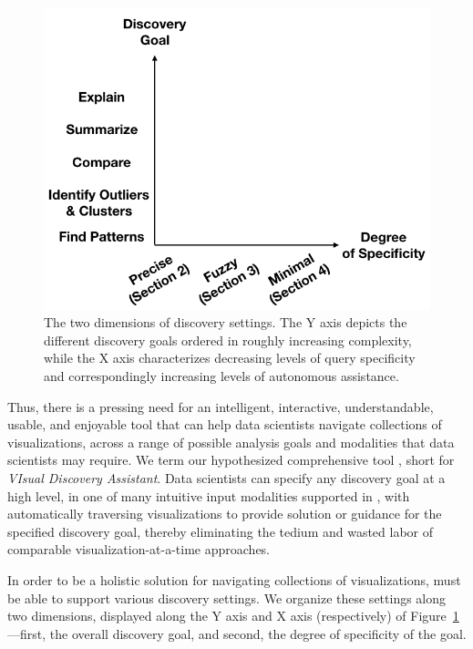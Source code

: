 \begin{figure}
\centering
\vspace{-10pt}
\includegraphics[width=\linewidth]{figures/dimensions_cropped.png}
\vspace{-15pt}
\caption{The two dimensions of discovery settings. The Y axis depicts the different discovery goals ordered in roughly increasing complexity, while the X axis characterizes decreasing levels of query specificity and correspondingly increasing levels of autonomous assistance.}\label{fig:dimensions}
\vspace{-15pt}
\end{figure}


\par
Thus, there is a pressing need for an 
intelligent,
interactive, understandable, usable, and
enjoyable tool that can help 
data scientists navigate
collections of visualizations, across a range of possible analysis goals and modalities that data scientists may require.
We term our hypothesized comprehensive tool \vida,
short for {\em VIsual Discovery Assistant}.
Data scientists can specify any discovery
goal at a high level, in one of many intuitive input modalities supported in \vida, with \vida automatically traversing visualizations to provide solution or guidance for the
specified discovery goal, thereby
eliminating the tedium and wasted
labor of comparable visualization-at-a-time 
approaches.

\par
{} 
In order to be a holistic solution for 
navigating collections of visualizations,
\vida must be able to support various discovery
settings. 
We organize these settings along two
dimensions, displayed along the Y axis and 
X axis (respectively) of Figure~\ref{fig:dimensions}---first, 
the overall discovery goal,
and second, the degree of specificity of the goal.



